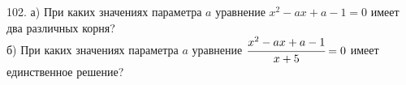 102. а) При каких значениях параметра $a$ уравнение $x^2-ax+a-1=0$ имеет два различных корня?\\
б) При каких значениях параметра $a$ уравнение $\cfrac{x^2-ax+a-1}{x+5}=0$ имеет единственное решение?\\
